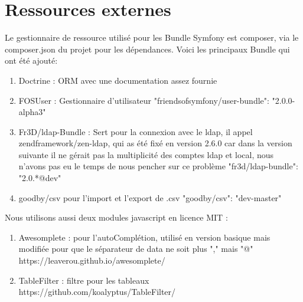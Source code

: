\chapter{Ressources externes}
Le gestionnaire de ressource utilisé pour les Bundle Symfony est composer, via le composer.json du projet pour les dépendances.
Voici les principaux Bundle qui ont été ajouté:
 \newline
\begin{enumerate}

\item Doctrine : ORM avec une documentation assez fournie
 \newline
 \item FOSUser : Gestionnaire d'utilisateur
 \newline	"friendsofsymfony/user-bundle": "2.0.0-alpha3"
	 \newline
\item Fr3D/ldap-Bundle : Sert pour la connexion avec le ldap, il appel zendframework/zen-ldap, qui as été fixé en version 2.6.0 car dans la version suivante il ne gérait pas la multiplicité des comptes ldap et local, nous n'avons pas eu le temps de nous pencher sur ce problème
     \newline    "fr3d/ldap-bundle": "2.0.*@dev"
         \newline
\item goodby/csv pour l'import et l'export de .csv
    \newline     "goodby/csv": "dev-master"
 \newline
\end{enumerate}


Nous utilisons aussi deux modules javascript en licence MIT :

 \begin{enumerate}

\item Awesomplete : pour l'autoComplétion, utilisé en version basique mais modifiée pour que le séparateur de data ne soit plus "," mais "@"
\newline https://leaverou.github.io/awesomplete/
	\newline
\item TableFilter : filtre pour les tableaux
\newline https://github.com/koalyptus/TableFilter/	
\newline

\end{enumerate}